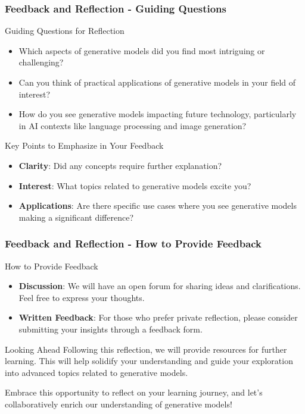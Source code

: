 \documentclass[aspectratio=169]{beamer}
\begin{document}
\begin{frame}[fragile]
    \frametitle{Feedback and Reflection - Guiding Questions}
    \begin{block}{Guiding Questions for Reflection}
        \begin{itemize}
            \item Which aspects of generative models did you find most intriguing or challenging?
            \item Can you think of practical applications of generative models in your field of interest?
            \item How do you see generative models impacting future technology, particularly in AI contexts like language processing and image generation?
        \end{itemize}
    \end{block}
    
    \begin{block}{Key Points to Emphasize in Your Feedback}
        \begin{itemize}
            \item \textbf{Clarity}: Did any concepts require further explanation?
            \item \textbf{Interest}: What topics related to generative models excite you?
            \item \textbf{Applications}: Are there specific use cases where you see generative models making a significant difference?
        \end{itemize}
    \end{block}
\end{frame}

\begin{frame}[fragile]
    \frametitle{Feedback and Reflection - How to Provide Feedback}
    \begin{block}{How to Provide Feedback}
        \begin{itemize}
            \item \textbf{Discussion}: We will have an open forum for sharing ideas and clarifications. Feel free to express your thoughts.
            \item \textbf{Written Feedback}: For those who prefer private reflection, please consider submitting your insights through a feedback form.
        \end{itemize}
    \end{block}
    
    \begin{block}{Looking Ahead}
        Following this reflection, we will provide resources for further learning. This will help solidify your understanding and guide your exploration into advanced topics related to generative models.
    \end{block}
    
    Embrace this opportunity to reflect on your learning journey, and let’s collaboratively enrich our understanding of generative models!
\end{frame}
\end{document}

